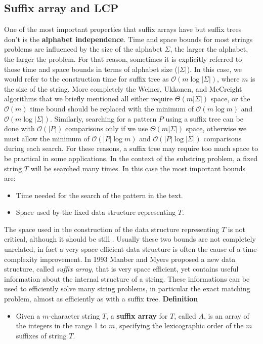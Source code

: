\documentclass[a4paper,12pt, oneside]{article}
\begin{document}
\subsection{Suffix array and LCP}
One of the most important properties that suffix arrays have but suffix trees don't is the \textbf{alphabet independence}. Time and space bounds for most strings problems are influenced by the size of the alphabet $\Sigma$, the larger the alphabet, the larger the problem. For that reason, sometimes it is explicitly referred to those time and space bounds in terms of alphabet size ($|\Sigma|$). In this case, we would refer to the construction time for suffix tree as $\mathcal{O}(m\log|\Sigma|)$, where $m$ is the size of the string. More completely the Weiner, Ukkonen, and McCreight algorithms that we briefly mentioned all either require $\Theta(m|\Sigma|)$ space, or the $\mathcal{O}(m)$ time bound should be replaced with the minimum of $\mathcal{O}(m\log m)$ and $\mathcal{O}(m \log |\Sigma|)$. Similarly, searching for a pattern $P$ using a suffix tree can be done with $\mathcal{O}(|P|)$ comparisons only if we use $\Theta(m|\Sigma|)$ space, otherwise we must allow the minimum of $\mathcal{O}(|P|\log m)$ and $\mathcal{O}(|P|\log |\Sigma|)$ comparisons during each search. For these reasons, a suffix tree may require too much space to be practical in some applications.
In the context of the substring problem, a fixed string $T$ will be searched many times. In this case the most important bounds are:
\begin{itemize}
	\item Time needed for the search of the pattern in the text.
	\item Space used by the fixed data structure representing $T$.
\end{itemize}

The space used in the construction of the data structure representing $T$ is not critical, although it should be still .
Usually these two bounds are not completely unrelated, in fact a very space efficient data structure is often the cause of a time-complexity improvement.
In 1993 Manber and Myers \cite{suffixarray} proposed a new data structure, called \textit{suffix array}, that is very space efficient, yet contains useful information about the internal structure of a string. These informations can be used to efficiently solve many string problems, in particular the exact matching problem, almost as efficiently as with a suffix tree. \newline \newline
\textbf{Definition} 
\begin{itemize}
	\item Given a $m$-character string $T$, a \textbf{suffix array} for $T$, called $A$, is an array of the integers in the range 1 to $m$, specifying the lexicographic order of the $m$ suffixes of string $T$.
\end{itemize}
\end{document}
